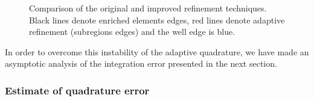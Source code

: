 \begin{figure}[!htb]
  \centering    
  \hspace{0pt}
  \caption[Adaptive refinement comparison]
  {Comparison of the original and improved refinement techniques.
   Black lines denote enriched elements edges, red lines denote adaptive refinement (subregions edges) and the well
   edge is blue.
  }
  \label{fig:adapt_refinement}
\end{figure}
In order to overcome this instability of the adaptive quadrature, we have made an asymptotic analysis of the integration error presented 
in the next section.

\subsubsection{Estimate of quadrature error}

